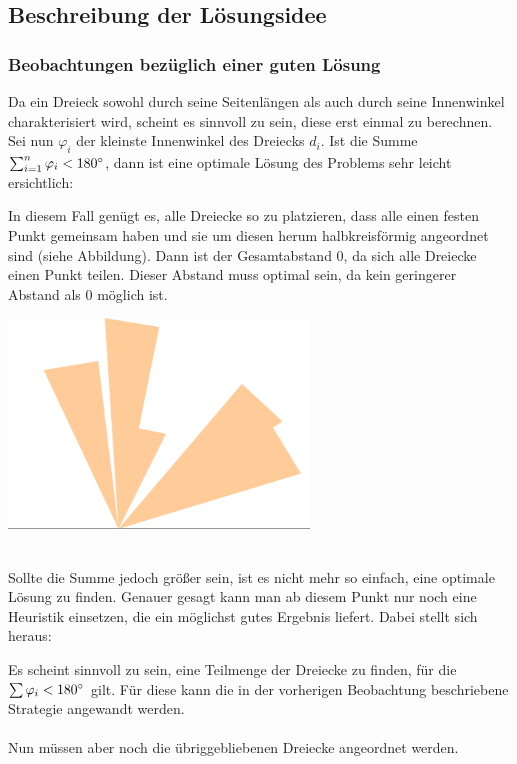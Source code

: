 \documentclass[a4paper, notitlepage, 12pt]{scrartcl}
\begin{document}
  \subsection{Beschreibung der Lösungsidee}
  \subsubsection{Beobachtungen bezüglich einer guten Lösung}  
  Da ein Dreieck sowohl durch seine Seitenlängen als auch durch seine Innenwinkel charakterisiert wird, scheint es sinnvoll zu sein, diese erst einmal zu berechnen. Sei nun $\varphi_i$ der kleinste Innenwinkel des Dreiecks $d_i$. Ist die Summe $\sum_{i=1}^{n} \varphi_i < 180\degree$, dann ist eine optimale Lösung des Problems sehr leicht ersichtlich:
  \begin{kasten}
  	In diesem Fall genügt es, alle Dreiecke so zu platzieren, dass alle einen festen Punkt gemeinsam haben und sie um diesen herum halbkreisförmig angeordnet sind (siehe Abbildung). Dann ist der Gesamtabstand $0$, da sich alle Dreiecke einen Punkt teilen. Dieser Abstand muss optimal sein, da kein geringerer Abstand als $0$ möglich ist. \\
  	{\centering
  		\includegraphics[width=0.6\textwidth]{pics/optimal-tri.png}
  	\par}
  \end{kasten} ~\\
 Sollte die Summe jedoch größer sein, ist es nicht mehr so einfach, eine optimale Lösung zu finden. Genauer gesagt kann man ab diesem Punkt nur noch eine Heuristik einsetzen, die ein möglichst gutes Ergebnis liefert. Dabei stellt sich heraus:
 \begin{kasten}
 	Es scheint sinnvoll zu sein, eine Teilmenge der Dreiecke zu finden, für die $\sum \varphi_i < 180\degree$ gilt. Für diese kann die in der vorherigen Beobachtung beschriebene Strategie angewandt werden. \\ \\
 	Nun müssen aber noch die übriggebliebenen Dreiecke angeordnet werden. %
 \end{kasten}
\end{document}
